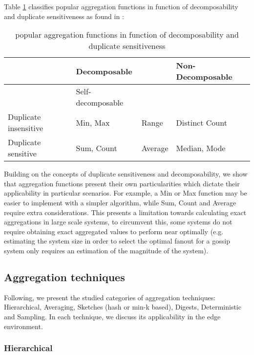 Table \ref{table:aggregation_functions} classifies popular aggregation functions in function of decomposability and duplicate sensitiveness as found in \cite{DBLP:journals/corr/abs-1110-0725}:

\begin{table}[]
    \begin{tabular}{|l|l|l|l|}
    \hline
                          & \multicolumn{2}{l|}{Decomposable} & Non-Decomposable  \\ \hline
                          & Self-decomposable    &                             &  \\ \hline
    Duplicate insensitive & Min, Max             & Range     & Distinct Count    \\ \hline
    Duplicate sensitive   & Sum, Count           & Average   & Median, Mode     \\ \hline
    \end{tabular}
    \caption{popular aggregation functions in function of decomposability and duplicate sensitiveness}
    \label{table:aggregation_functions}
\end{table}

Building on the concepts of duplicate sensitiveness and decomposability, we show that aggregation functions present their own particularities which dictate their applicability in particular scenarios. For example, a Min or Max function may be easier to implement with a simpler algorithm, while Sum, Count and Average require extra considerations. This presents a limitation towards calculating exact aggregations in large scale systems, to circumvent this, some systems do not require obtaining exact aggregated values to perform near optimally  (e.g. estimating the system size in order to select the optimal fanout for a gossip system only requires an estimation of the magnitude of the system). 

\subsection{Aggregation techniques}

Following, we present the studied categories of aggregation techniques: Hierarchical, Averaging, Sketches (hash or min-k based), Digests, Deterministic and Sampling. In each technique, we discuss its applicability in the edge environment.

\subsubsection{Hierarchical}

